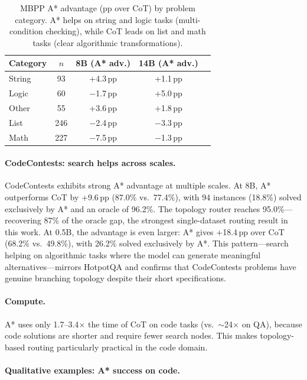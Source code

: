 \documentclass[11pt]{article}
\begin{document}
{{\begin{table}[ht]
\centering
\small
\begin{tabular}{lcccc}
\toprule
\textbf{Category} & \textbf{$n$} & \textbf{8B (A* adv.)} & \textbf{14B (A* adv.)} \\
\midrule
String      & 93  & +4.3\,pp & +1.1\,pp \\
Logic       & 60  & $-$1.7\,pp & +5.0\,pp \\
Other       & 55  & +3.6\,pp & +1.8\,pp \\
List        & 246 & $-$2.4\,pp & $-$3.3\,pp \\
Math        & 227 & $-$7.5\,pp & $-$1.3\,pp \\
\bottomrule
\end{tabular}
\caption{MBPP A* advantage (pp over CoT) by problem category. A* helps on string and logic tasks (multi-condition checking), while CoT leads on list and math tasks (clear algorithmic transformations).}
\label{tab:code_categories}
\end{table}

\paragraph{CodeContests: search helps across scales.}
CodeContests exhibits strong A* advantage at multiple scales. At 8B, A* outperforms CoT by +9.6\,pp (87.0\% vs.\ 77.4\%), with 94 instances (18.8\%) solved exclusively by A* and an oracle of 96.2\%. The topology router reaches 95.0\%---recovering 87\% of the oracle gap, the strongest single-dataset routing result in this work. At 0.5B, the advantage is even larger: A* gives +18.4\,pp over CoT (68.2\% vs.\ 49.8\%), with 26.2\% solved exclusively by A*. This pattern---search helping on algorithmic tasks where the model can generate meaningful alternatives---mirrors HotpotQA and confirms that CodeContests problems have genuine branching topology despite their short specifications.

\paragraph{Compute.}
A* uses only 1.7--3.4$\times$ the time of CoT on code tasks (vs.\ $\sim$24$\times$ on QA), because code solutions are shorter and require fewer search nodes. This makes topology-based routing particularly practical in the code domain.

\paragraph{Qualitative examples: A* success on code.}

}}
\end{document}
